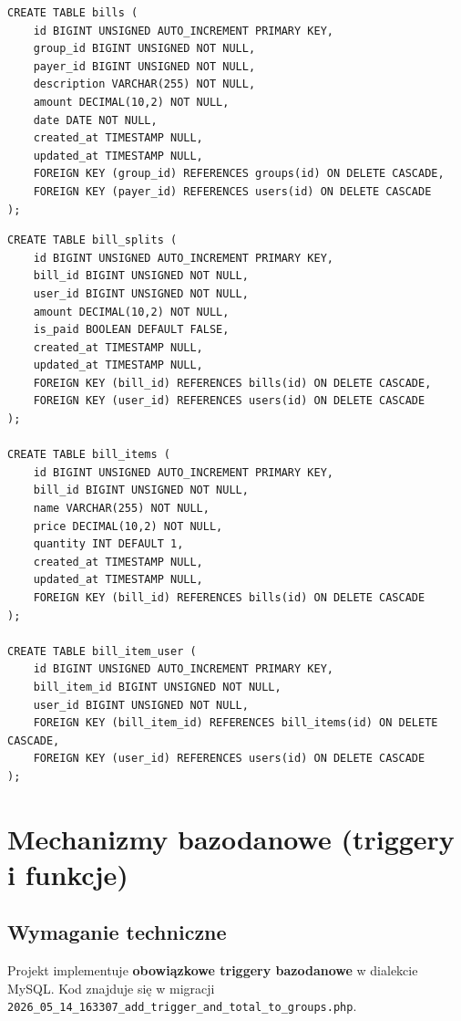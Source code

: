 \documentclass[12pt,a4paper]{report}
\begin{document}
\begin{lstlisting}[style=sqlstyle, caption={Rachunki}]
CREATE TABLE bills (
    id BIGINT UNSIGNED AUTO_INCREMENT PRIMARY KEY,
    group_id BIGINT UNSIGNED NOT NULL,
    payer_id BIGINT UNSIGNED NOT NULL,
    description VARCHAR(255) NOT NULL,
    amount DECIMAL(10,2) NOT NULL,
    date DATE NOT NULL,
    created_at TIMESTAMP NULL,
    updated_at TIMESTAMP NULL,
    FOREIGN KEY (group_id) REFERENCES groups(id) ON DELETE CASCADE,
    FOREIGN KEY (payer_id) REFERENCES users(id) ON DELETE CASCADE
);
\end{lstlisting}

\begin{lstlisting}[style=sqlstyle, caption={Podzia\l{} koszt\'ow i pozycje paragonu}]
CREATE TABLE bill_splits (
    id BIGINT UNSIGNED AUTO_INCREMENT PRIMARY KEY,
    bill_id BIGINT UNSIGNED NOT NULL,
    user_id BIGINT UNSIGNED NOT NULL,
    amount DECIMAL(10,2) NOT NULL,
    is_paid BOOLEAN DEFAULT FALSE,
    created_at TIMESTAMP NULL,
    updated_at TIMESTAMP NULL,
    FOREIGN KEY (bill_id) REFERENCES bills(id) ON DELETE CASCADE,
    FOREIGN KEY (user_id) REFERENCES users(id) ON DELETE CASCADE
);

CREATE TABLE bill_items (
    id BIGINT UNSIGNED AUTO_INCREMENT PRIMARY KEY,
    bill_id BIGINT UNSIGNED NOT NULL,
    name VARCHAR(255) NOT NULL,
    price DECIMAL(10,2) NOT NULL,
    quantity INT DEFAULT 1,
    created_at TIMESTAMP NULL,
    updated_at TIMESTAMP NULL,
    FOREIGN KEY (bill_id) REFERENCES bills(id) ON DELETE CASCADE
);

CREATE TABLE bill_item_user (
    id BIGINT UNSIGNED AUTO_INCREMENT PRIMARY KEY,
    bill_item_id BIGINT UNSIGNED NOT NULL,
    user_id BIGINT UNSIGNED NOT NULL,
    FOREIGN KEY (bill_item_id) REFERENCES bill_items(id) ON DELETE CASCADE,
    FOREIGN KEY (user_id) REFERENCES users(id) ON DELETE CASCADE
);
\end{lstlisting}

\chapter{Mechanizmy bazodanowe (triggery i funkcje)}

\section{Wymaganie techniczne}

Projekt implementuje \textbf{obowi\k{a}zkowe triggery bazodanowe} w dialekcie MySQL. Kod znajduje si\k{e} w migracji \texttt{2026\_05\_14\_163307\_add\_trigger\_and\_total\_to\_groups.php}.
\end{document}
